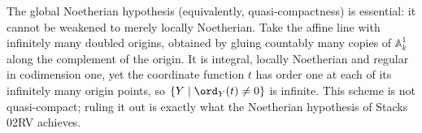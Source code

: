 \begin{remark}
  \label{rem:finite_support_needs_noetherian}
  The global Noetherian hypothesis (equivalently, quasi-compactness) is
  essential: it cannot be weakened to merely locally Noetherian. Take the
  affine line with infinitely many doubled origins, obtained by gluing
  countably many copies of \(\mathbb A^1_k\) along the complement of the origin.
  It is integral, locally Noetherian and regular in codimension one, yet the
  coordinate function \(t\) has order one at each of its infinitely many origin
  points, so \(\{Y \mid \ord_Y(t) \ne 0\}\) is infinite. This scheme is not
  quasi-compact; ruling it out is exactly what the Noetherian hypothesis of
  Stacks 02RV achieves.
\end{remark}

